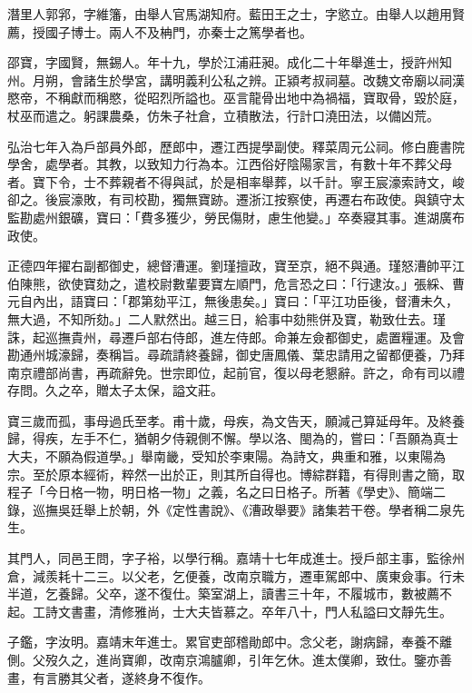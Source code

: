 \begin{pinyinscope}
潛里人郭郛，字維籓，由舉人官馬湖知府。藍田王之士，字慾立。由舉人以趙用賢薦，授國子博士。兩人不及柟門，亦秦士之篤學者也。

邵寶，字國賢，無錫人。年十九，學於江浦莊昶。成化二十年舉進士，授許州知州。月朔，會諸生於學宮，講明義利公私之辨。正潁考叔祠墓。改魏文帝廟以祠漢愍帝，不稱獻而稱愍，從昭烈所謚也。巫言龍骨出地中為禍福，寶取骨，毀於庭，杖巫而遣之。躬課農桑，仿朱子社倉，立積散法，行計口澆田法，以備凶荒。

弘治七年入為戶部員外郎，歷郎中，遷江西提學副使。釋菜周元公祠。修白鹿書院學舍，處學者。其教，以致知力行為本。江西俗好陰陽家言，有數十年不葬父母者。寶下令，士不葬親者不得與試，於是相率舉葬，以千計。寧王宸濠索詩文，峻卻之。後宸濠敗，有司校勘，獨無寶跡。遷浙江按察使，再遷右布政使。與鎮守太監勘處州銀礦，寶曰：「費多獲少，勞民傷財，慮生他變。」卒奏寢其事。進湖廣布政使。

正德四年擢右副都御史，總督漕運。劉瑾擅政，寶至京，絕不與通。瑾怒漕帥平江伯陳熊，欲使寶劾之，遣校尉數輩要寶左順門，危言恐之曰：「行逮汝。」張綵、曹元自內出，語寶曰：「郡第劾平江，無後患矣。」寶曰：「平江功臣後，督漕未久，無大過，不知所劾。」二人默然出。越三日，給事中劾熊併及寶，勒致仕去。瑾誅，起巡撫貴州，尋遷戶部右侍郎，進左侍郎。命兼左僉都御史，處置糧運。及會勘通州城濠歸，奏稱旨。尋疏請終養歸，御史唐鳳儀、葉忠請用之留都便養，乃拜南京禮部尚書，再疏辭免。世宗即位，起前官，復以母老懇辭。許之，命有司以禮存問。久之卒，贈太子太保，謚文莊。

寶三歲而孤，事母過氏至孝。甫十歲，母疾，為文告天，願減己算延母年。及終養歸，得疾，左手不仁，猶朝夕侍親側不懈。學以洛、閩為的，嘗曰：「吾願為真士大夫，不願為假道學。」舉南畿，受知於李東陽。為詩文，典重和雅，以東陽為宗。至於原本經術，粹然一出於正，則其所自得也。博綜群籍，有得則書之簡，取程子「今日格一物，明日格一物」之義，名之曰日格子。所著《學史》、簡端二錄，巡撫吳廷舉上於朝，外《定性書說》、《漕政舉要》諸集若干卷。學者稱二泉先生。

其門人，同邑王問，字子裕，以學行稱。嘉靖十七年成進士。授戶部主事，監徐州倉，減羨耗十二三。以父老，乞便養，改南京職方，遷車駕郎中、廣東僉事。行未半道，乞養歸。父卒，遂不復仕。築室湖上，讀書三十年，不履城市，數被薦不起。工詩文書畫，清修雅尚，士大夫皆慕之。卒年八十，門人私謚曰文靜先生。

子鑑，字汝明。嘉靖末年進士。累官吏部稽勛郎中。念父老，謝病歸，奉養不離側。父歿久之，進尚寶卿，改南京鴻臚卿，引年乞休。進太僕卿，致仕。鑒亦善畫，有言勝其父者，遂終身不復作。


\end{pinyinscope}
